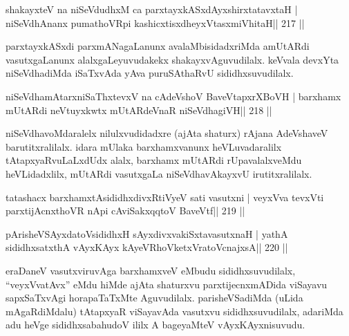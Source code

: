\begin{shl}
shakayxteV na niSeVdudhxM ca parxtayxkASxdAyxshirxtatavxtaH |
niSeVdhAnanx pumathoVR\s pi kashicxtisxdheyxVtasxmiVhitaH\hfill || 217 ||
\end{shl}

\begin{artha}
parxtayxkASxdi parxmANagaLanunx avalaMbisidadxriMda
amUtARdi vasutxgaLanunx alalxgaLeyuvudakekx shakayxvAguvudilalx.
keVvala devxYta niSeVdhadiMda iSaTxvAda yAva puruSAthaRvU
sididhxsuvudilalx.
\end{artha}

\begin{shl}
niSeVdhamAtarxniSaThxtevxV na cA\s\s deVshoV BaveVtapxrXBoVH |
barxhamx mUtARdi neVtuyxkwtx mUtARdeVnaR niSeVdhagiVH\hfill || 218 ||
\end{shl}

\begin{artha}
niSeVdhavoMdaralelx nilulxvudidadxre (ajAta shaturx) rAjana AdeVshaveV barutitxralilalx. idara mUlaka barxhamxvanunx heVLuvadaralilx tAtapxyaRvuLaLxdUdx alalx, barxhamx mUtARdi rUpavalalxveMdu heVLidadxlilx, mUtARdi vasutxgaLa niSeVdhavAkayxvU irutitxralilalx.
\end{artha}


\begin{shl}
tatashacx barxhamxtAsididhxdivxRtiVyeV sati vasutxni |
veyxVva tevxVti parxtijAcnxthoVR nApi cA\s\s viSakxqqtoV BaveVtf\hfill || 219 ||
\end{shl}

\begin{shl}
pArisheVSAyxdatoV\s sididhxH sAyxdivxvakiSxtavasutxnaH |
yathA sididhxsatxthA vAyxKAyx kAyeVRhoVketxVratoV\s cnajxsA\hfill || 220 ||
\end{shl}


\begin{artha}
eraDaneV vasutxviruvAga barxhamxveV eMbudu sididhxsuvudilalx, ``veyxVvatAvx'' eMdu hiMde ajAta shaturxvu parxtijecnxmADida viSayavu sapxSaTxvAgi horapaTaTxMte Aguvudilalx. parisheVSadiMda (uLida mAgaRdiMdalu) tAtapxyaR viSayavAda vasutxvu sididhxsuvudilalx, adariMda adu heVge sididhxsabahudoV ililx A bageyaMteV vAyxKAyxnisuvudu.
\end{artha}

